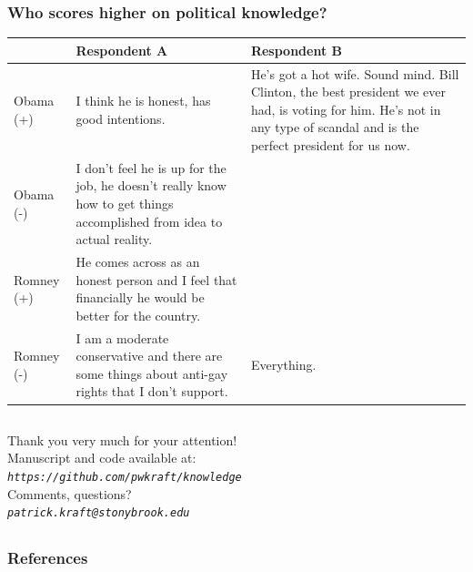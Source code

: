 \documentclass{beamer}
\begin{document}
\begin{frame}%
\frametitle{Who scores higher on political knowledge?}
\begin{table}[ht]\footnotesize\centering
\begin{tabular}{l|p{4.5cm}|p{4.5cm}}
   \toprule
    & \textbf{Respondent A} & \textbf{Respondent B} \\ 
    \midrule
  Obama (+) & I think he is honest, has good intentions. & He's got a hot wife. Sound mind. Bill Clinton, the best president we ever had, is voting for him. He's not in any type of scandal and is the perfect president for us now. \\ \hdashline
  Obama (-) & I don't feel he is up for the job, he doesn't really know how to get things accomplished from idea to actual reality. &  \\ \hdashline
  Romney (+) & He comes across as an honest person and I feel that financially he would be better for the country. &  \\ \hdashline
  Romney (-) & I am a moderate conservative and there are some things about anti-gay rights that I don't support. & Everything. \\
    \bottomrule
 \end{tabular}
\end{table}
\end{frame}


\subsection{}
\begin{frame}%
  \begin{center}
  \large{Thank you very much for your attention!}\\ \vspace{2em}
  Manuscript and code available at:\\
  \emph{\texttt{https://github.com/pwkraft/knowledge}}\\ \vspace{2em}
  Comments, questions?\\
  \emph{\texttt{patrick.kraft@stonybrook.edu}}
  \end{center}
\end{frame}

\subsection{}
\begin{frame}
  \frametitle{References}
  \def\newblock{\hskip .11em plus .33em minus .07em}
  \begin{scriptsize}
    
    
  \end{scriptsize}
\end{frame}
\end{document}
